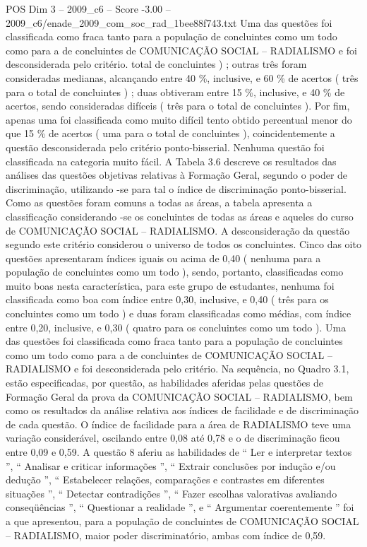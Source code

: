 \begin{textsample}{POS Dim 3 – 2009\_c6 – Score -3.00 – 2009\_c6/enade\_2009\_com\_soc\_rad\_1bee88f743.txt}
Uma das questões foi classificada como fraca tanto para a população de concluintes como um todo como para a de concluintes de COMUNICAÇÃO SOCIAL – RADIALISMO e foi desconsiderada pelo critério. total de concluintes ) ; outras três foram consideradas medianas, alcançando entre 40 \%, inclusive, e 60 \% de acertos ( três para o total de concluintes ) ; duas obtiveram entre 15 \%, inclusive, e 40 \% de acertos, sendo consideradas difíceis ( três para o total de concluintes ).
Por fim, apenas uma foi classificada como muito difícil tento obtido percentual menor do que 15 \% de acertos ( uma para o total de concluintes ), coincidentemente a questão desconsiderada pelo critério ponto-bisserial.
Nenhuma questão foi classificada na categoria muito fácil.
A Tabela 3.6 descreve os resultados das análises das questões objetivas relativas à Formação Geral, segundo o poder de discriminação, utilizando -se para tal o índice de discriminação ponto-bisserial.
Como as questões foram comuns a todas as áreas, a tabela apresenta a classificação considerando -se os concluintes de todas as áreas e aqueles do curso de COMUNICAÇÃO SOCIAL – RADIALISMO.
A desconsideração da questão segundo este critério considerou o universo de todos os concluintes.
Cinco das oito questões apresentaram índices iguais ou acima de 0,40 ( nenhuma para a população de concluintes como um todo ), sendo, portanto, classificadas como muito boas nesta característica, para este grupo de estudantes, nenhuma foi classificada como boa com índice entre 0,30, inclusive, e 0,40 ( três para os concluintes como um todo ) e duas foram classificadas como médias, com índice entre 0,20, inclusive, e 0,30 ( quatro para os concluintes como um todo ).
Uma das questões foi classificada como fraca tanto para a população de concluintes como um todo como para a de concluintes de COMUNICAÇÃO SOCIAL – RADIALISMO e foi desconsiderada pelo critério.
Na sequência, no Quadro 3.1, estão especificadas, por questão, as habilidades aferidas pelas questões de Formação Geral da prova da COMUNICAÇÃO SOCIAL – RADIALISMO, bem como os resultados da análise relativa aos índices de facilidade e de discriminação de cada questão.
O índice de facilidade para a área de RADIALISMO teve uma variação considerável, oscilando entre 0,08 até 0,78 e o de discriminação ficou entre 0,09 e 0,59.
A questão 8 aferiu as habilidades de “ Ler e interpretar textos ”, “ Analisar e criticar informações ”, “ Extrair conclusões por indução e/ou dedução ”, “ Estabelecer relações, comparações e contrastes em diferentes situações ”, “ Detectar contradições ”, “ Fazer escolhas valorativas avaliando conseqüências ”, “ Questionar a realidade ”, e “ Argumentar coerentemente ” foi a que apresentou, para a população de concluintes de COMUNICAÇÃO SOCIAL – RADIALISMO, maior poder discriminatório, ambas com índice de 0,59.

\end{textsample}

